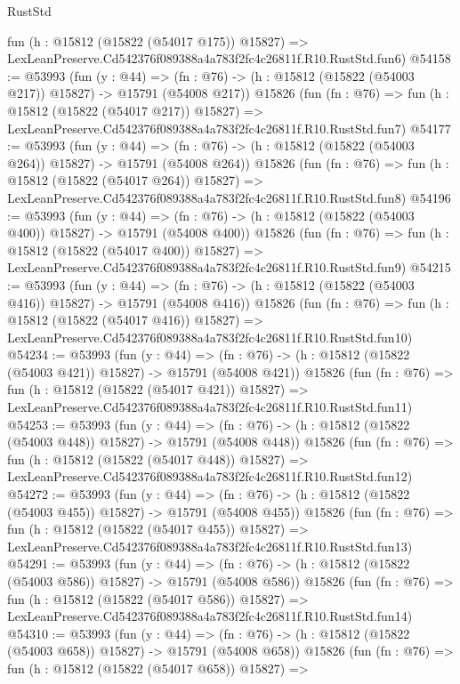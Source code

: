 \begin{lexlean}{RustStd}
\begin{coremodule}
    fun (h : @15812 (@15822 (@54017 @175)) @15827) =>
    LexLeanPreserve.Cd542376f089388a4a783f2fc4c26811f.R10.RustStd.fun6)
@54158 := @53993
    (fun (y : @44) =>
    (fn : @76) -> (h : @15812 (@15822 (@54003 @217)) @15827) -> @15791 (@54008 @217))
    @15826
    (fun (fn : @76) =>
    fun (h : @15812 (@15822 (@54017 @217)) @15827) =>
    LexLeanPreserve.Cd542376f089388a4a783f2fc4c26811f.R10.RustStd.fun7)
@54177 := @53993
    (fun (y : @44) =>
    (fn : @76) -> (h : @15812 (@15822 (@54003 @264)) @15827) -> @15791 (@54008 @264))
    @15826
    (fun (fn : @76) =>
    fun (h : @15812 (@15822 (@54017 @264)) @15827) =>
    LexLeanPreserve.Cd542376f089388a4a783f2fc4c26811f.R10.RustStd.fun8)
@54196 := @53993
    (fun (y : @44) =>
    (fn : @76) -> (h : @15812 (@15822 (@54003 @400)) @15827) -> @15791 (@54008 @400))
    @15826
    (fun (fn : @76) =>
    fun (h : @15812 (@15822 (@54017 @400)) @15827) =>
    LexLeanPreserve.Cd542376f089388a4a783f2fc4c26811f.R10.RustStd.fun9)
@54215 := @53993
    (fun (y : @44) =>
    (fn : @76) -> (h : @15812 (@15822 (@54003 @416)) @15827) -> @15791 (@54008 @416))
    @15826
    (fun (fn : @76) =>
    fun (h : @15812 (@15822 (@54017 @416)) @15827) =>
    LexLeanPreserve.Cd542376f089388a4a783f2fc4c26811f.R10.RustStd.fun10)
@54234 := @53993
    (fun (y : @44) =>
    (fn : @76) -> (h : @15812 (@15822 (@54003 @421)) @15827) -> @15791 (@54008 @421))
    @15826
    (fun (fn : @76) =>
    fun (h : @15812 (@15822 (@54017 @421)) @15827) =>
    LexLeanPreserve.Cd542376f089388a4a783f2fc4c26811f.R10.RustStd.fun11)
@54253 := @53993
    (fun (y : @44) =>
    (fn : @76) -> (h : @15812 (@15822 (@54003 @448)) @15827) -> @15791 (@54008 @448))
    @15826
    (fun (fn : @76) =>
    fun (h : @15812 (@15822 (@54017 @448)) @15827) =>
    LexLeanPreserve.Cd542376f089388a4a783f2fc4c26811f.R10.RustStd.fun12)
@54272 := @53993
    (fun (y : @44) =>
    (fn : @76) -> (h : @15812 (@15822 (@54003 @455)) @15827) -> @15791 (@54008 @455))
    @15826
    (fun (fn : @76) =>
    fun (h : @15812 (@15822 (@54017 @455)) @15827) =>
    LexLeanPreserve.Cd542376f089388a4a783f2fc4c26811f.R10.RustStd.fun13)
@54291 := @53993
    (fun (y : @44) =>
    (fn : @76) -> (h : @15812 (@15822 (@54003 @586)) @15827) -> @15791 (@54008 @586))
    @15826
    (fun (fn : @76) =>
    fun (h : @15812 (@15822 (@54017 @586)) @15827) =>
    LexLeanPreserve.Cd542376f089388a4a783f2fc4c26811f.R10.RustStd.fun14)
@54310 := @53993
    (fun (y : @44) =>
    (fn : @76) -> (h : @15812 (@15822 (@54003 @658)) @15827) -> @15791 (@54008 @658))
    @15826
    (fun (fn : @76) =>
    fun (h : @15812 (@15822 (@54017 @658)) @15827) =>

\end{coremodule}
\end{lexlean}
